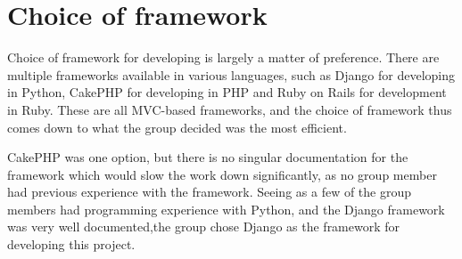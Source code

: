 \section{Choice of framework}
Choice of framework for developing is largely a matter of preference. There are multiple frameworks available in various languages, such as Django\cite{djangoproject11}  for developing in Python, CakePHP\cite{cake11} for developing in PHP and Ruby on Rails\cite{ruby11} for development in Ruby. These are all MVC-based frameworks, and the choice of framework thus comes down to what the group decided was the most efficient.

CakePHP was one option, but there is no singular documentation for the framework which would slow the work down significantly, as no group member had previous experience with the framework. Seeing as a few of the group members had programming experience with Python, and the Django framework was very well documented,the group chose Django as the framework for developing this project.

